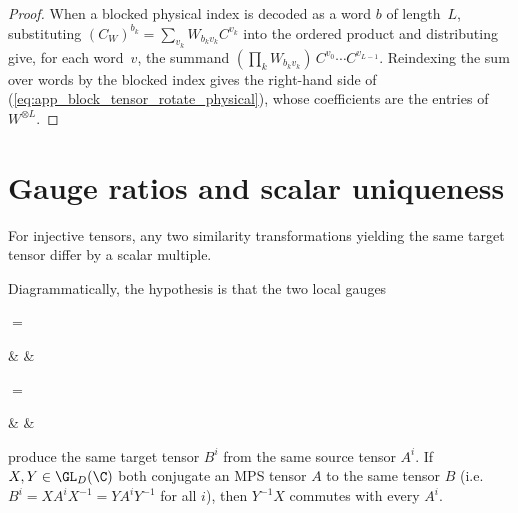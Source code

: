 \begin{proof}\leanok
    When a blocked physical index is decoded as a word $b$ of length~$L$,
    substituting $(C_W)^{b_k}=\sum_{v_k}W_{b_kv_k}C^{v_k}$ into the ordered
    product and distributing give, for each word~$v$, the summand
    $(\prod_kW_{b_kv_k})\,C^{v_0}\cdots C^{v_{L-1}}$. Reindexing the sum over
    words by the blocked index gives the right-hand side of
    (\ref{eq:app_block_tensor_rotate_physical}), whose coefficients are the
    entries of $W^{\otimes L}$.
\end{proof}

\section{Gauge ratios and scalar uniqueness}
\label{sec:app_symmetry_gauge_ratios}

For injective tensors, any two similarity transformations yielding the same
target tensor differ by a scalar multiple.

\begin{lemma}%
    \label{lem:gauge_ratio_commutes}
    \leanok
    Diagrammatically, the hypothesis is that the two local gauges
    \begin{center}
        \tenkzkernel
        \begin{tenkz}[cols=1, boundary=open]
        \end{tenkz}
        $ = $
        \begin{tenkz}[boundary=open]
             &  &
        \end{tenkz}

        \qquad{}\qquad

        \begin{tenkz}[cols=1, boundary=open]
        \end{tenkz}
        $ = $
        \begin{tenkz}[boundary=open]
             &  &
        \end{tenkz}
    \end{center}
    produce the same target tensor $B^i$ from the same source tensor
    $A^i$.
    If $X, Y \in \GL_D(\C)$ both conjugate an MPS tensor $A$ to the same
    tensor $B$ (i.e.\ $B^i = X A^i X^{-1} = Y A^i Y^{-1}$ for all $i$),
    then $Y^{-1} X$ commutes with every $A^i$.
\end{lemma}

